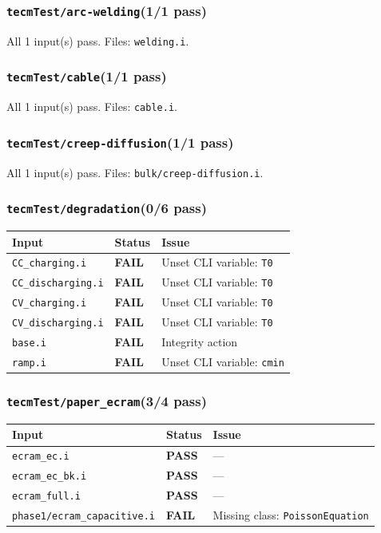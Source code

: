 \documentclass[10pt,letterpaper]{article}
\newcommand{\PASS}{\textcolor{passgreen}{\textbf{PASS}}}
\newcommand{\FAIL}{\textcolor{failred}{\textbf{FAIL}}}
\newcommand{\code}[1]{\texttt{\small #1}}
\begin{document}
\subsubsection{\code{tecmTest/arc-welding}\hfill (1/1 pass)}
All 1 input(s) pass. Files: \code{welding.i}.

\subsubsection{\code{tecmTest/cable}\hfill (1/1 pass)}
All 1 input(s) pass. Files: \code{cable.i}.

\subsubsection{\code{tecmTest/creep-diffusion}\hfill (1/1 pass)}
All 1 input(s) pass. Files: \code{bulk/creep-diffusion.i}.

\subsubsection{\code{tecmTest/degradation}\hfill (0/6 pass)}
\begin{longtable}{p{} l p{}}
\toprule
Input & Status & Issue \\
\midrule
\endhead
\code{CC\_charging.i} & \FAIL & Unset CLI variable: \code{T0} \\
\code{CC\_discharging.i} & \FAIL & Unset CLI variable: \code{T0} \\
\code{CV\_charging.i} & \FAIL & Unset CLI variable: \code{T0} \\
\code{CV\_discharging.i} & \FAIL & Unset CLI variable: \code{T0} \\
\code{base.i} & \FAIL & Integrity action \\
\code{ramp.i} & \FAIL & Unset CLI variable: \code{cmin} \\
\bottomrule
\end{longtable}

\subsubsection{\code{tecmTest/paper\_ecram}\hfill (3/4 pass)}
\begin{longtable}{p{} l p{}}
\toprule
Input & Status & Issue \\
\midrule
\endhead
\code{ecram\_ec.i} & \PASS & --- \\
\code{ecram\_ec\_bk.i} & \PASS & --- \\
\code{ecram\_full.i} & \PASS & --- \\
\code{phase1/ecram\_capacitive.i} & \FAIL & Missing class: \code{PoissonEquation} \\
\bottomrule
\end{longtable}
\end{document}
